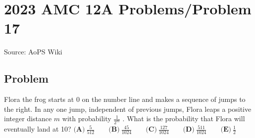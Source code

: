 \documentclass[12pt]{article}
\begin{document}
\section*{{2023 AMC 12A Problems/Problem 17}}
Source: AoPS Wiki

\subsection*{Problem}
Flora the frog starts at 0 on the number line and makes a sequence of jumps to the right. In any one jump, independent of previous jumps, Flora leaps a positive integer distance $m$ with probability $\frac{1}{2^m}$ . What is the probability that Flora will eventually land at 10? $\textbf{(A)}~\frac{5}{512}\qquad\textbf{(B)}~\frac{45}{1024}\qquad\textbf{(C)}~\frac{127}{1024}\qquad\textbf{(D)}~\frac{511}{1024}\qquad\textbf{(E)}~\frac{1}{2}$
\end{document}
